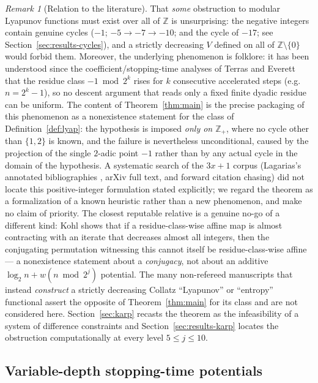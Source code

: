 \documentclass[11pt]{amsart}
\theoremstyle{definition}
\theoremstyle{remark}
\newtheorem{remark}[theorem]{Remark}
\newcommand{\Z}{\mathbb{Z}}
\begin{document}
\begin{remark}[Relation to the literature]\label{rem:originality}
That \emph{some} obstruction to modular Lyapunov functions must exist over all of $\Z$ is unsurprising: the negative integers contain genuine cycles ($-1$; $-5 \to -7 \to -10$; and the cycle of $-17$; see Section~\ref{sec:results-cycles}), and a strictly decreasing $V$ defined on all of $\Z\setminus\{0\}$ would forbid them. Moreover, the underlying phenomenon is folklore: it has been understood since the coefficient/stopping-time analyses of Terras \cite{terras1976} and Everett \cite{everett1977} that the residue class $-1 \bmod 2^k$ rises for $k$ consecutive accelerated steps (e.g.\ $n = 2^k - 1$), so no descent argument that reads only a fixed finite dyadic residue can be uniform. The content of Theorem~\ref{thm:main} is the precise packaging of this phenomenon as a nonexistence statement for the class of Definition~\ref{def:lyap}: the hypothesis is imposed \emph{only on $\Z_+$}, where no cycle other than $\{1,2\}$ is known, and the failure is nevertheless unconditional, caused by the projection of the single $2$-adic point $-1$ rather than by any actual cycle in the domain of the hypothesis. A systematic search of the $3x+1$ corpus (Lagarias's annotated bibliographies \cite{lagarias2010}, arXiv full text, and forward citation chasing) did not locate this positive-integer formulation stated explicitly; we regard the theorem as a formalization of a known heuristic rather than a new phenomenon, and make no claim of priority. The closest reputable relative is a genuine no-go of a different kind: Kohl \cite{kohl2008} shows that if a residue-class-wise affine map is almost contracting with an iterate that decreases almost all integers, then the conjugating permutation witnessing this cannot itself be residue-class-wise affine --- a nonexistence statement about a \emph{conjugacy}, not about an additive $\log_2 n + w(n \bmod 2^j)$ potential. The many non-refereed manuscripts that instead \emph{construct} a strictly decreasing Collatz ``Lyapunov'' or ``entropy'' functional assert the opposite of Theorem~\ref{thm:main} for its class and are not considered here. Section~\ref{sec:karp} recasts the theorem as the infeasibility of a system of difference constraints and Section~\ref{sec:results-karp} locates the obstruction computationally at every level $5 \le j \le 10$.
\end{remark}

\subsection{Variable-depth stopping-time potentials}\label{sec:stopping}
\end{document}
